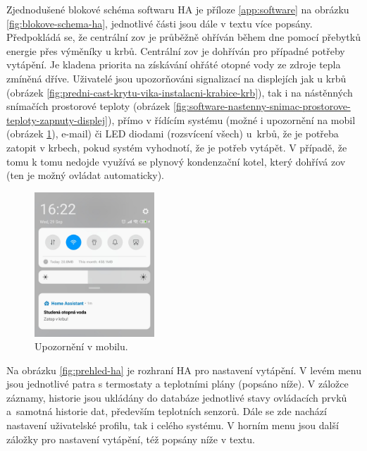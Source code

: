 Zjednodušené blokové schéma softwaru HA je příloze \ref{app:software} na obrázku \ref{fig:blokove-schema-ha}, jednotlivé části jsou dále v textu více popsány. Předpokládá se, že centrální \acrshort{zov} je průběžně ohříván během dne pomocí přebytků energie přes výměníky u krbů. Centrální \acrshort{zov} je dohříván pro případné potřeby vytápění. Je kladena priorita na získávání ohřáté otopné vody ze zdroje tepla zmíněná dříve. Uživatelé jsou upozorňováni signalizací na displejích jak u krbů (obrázek \ref{fig:predni-cast-krytu-vika-instalacni-krabice-krb}), tak i na nástěnných snímačích prostorové teploty (obrázek \ref{fig:software-nastenny-snimac-prostorove-teploty-zapnuty-displej}), přímo v řídícím systému (možné i upozornění  na mobil (obrázek \ref{fig:mobil-notifikace}), e-mail) či LED diodami (rozsvícení všech) u~krbů, že je potřeba zatopit v krbech, pokud systém vyhodnotí, že je potřeb vytápět. V případě, že tomu k tomu nedojde využívá se plynový kondenzační kotel, který dohřívá \acrshort{zov} (ten je možný ovládat automaticky).

\begin{figure}[H]
    \centering
    \includegraphics[width=0.4\textwidth]{images/software-ha/mobil-notifikace.png}
    \caption{Upozornění v mobilu.}
    \label{fig:mobil-notifikace}
\end{figure}

Na obrázku \ref{fig:prehled-ha} je rozhraní HA pro nastavení vytápění. V levém menu jsou jednotlivé patra s termostaty a teplotními plány (popsáno níže). V záložce záznamy, historie jsou ukládány do databáze jednotlivé stavy ovládacích prvků a~samotná historie dat, především teplotních senzorů. Dále se zde nachází nastavení uživatelské profilu, tak i celého systému. V horním menu jsou další záložky pro nastavení vytápění, též popsány níže v textu.

